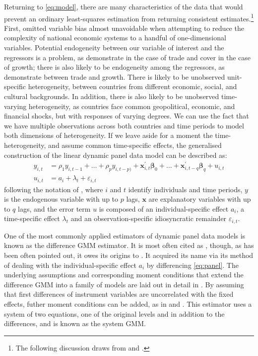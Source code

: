 \documentclass[12pt,a4paper]{article}
\begin{document}
Returning to \cref{eq:model}, there are many characteristics of the data that would prevent an ordinary least-squares estimation from returning consistent estimates.\footnote{
The following discussion draws from \cite{fritschGMMEstimationLinear2019} and \cite{rashidDynamicPanelData2018}.
}
First, omitted variable bias almost unavoidable when attempting to reduce the complexity of national economic systems to a handful of one-dimensional variables.
Potential endogeneity between our variable of interest and the regressors is a problem, as \cite{shahbazDynamicLinksEnergy2013} demonstrate in the case of trade and \cite{nayanRevisitingEnergyConsumption2013} cover in the case of growth; there is also likely to be endogeneity among the regressors, as \cite{rodriguezTradePolicyEconomic2001} demonstrate between trade and growth.
There is likely to be unobserved unit-specific heterogeneity, between countries from different economic, social, and cultural backgrounds.
In addition, there is also likely to be unobserved time-varying heterogeneity, as countries face common geopolitical, economic, and financial shocks, but with responses of varying degrees.
We can use the fact that we have multiple observations across both countries and time periods to model both dimensions of heterogeneity.
If we leave aside for a moment the time-heterogeneity, and assume common time-specific effects, the generalised construction of the linear dynamic panel data model can be described as:
\begin{align}
y_{i,t} &= \rho_1 y_{i,t-1} + \dots + \rho_p y_{i,t-p)} 
	+ \boldsymbol{x}^\prime_{i,t} \boldsymbol{\beta}_0 + \dots + \boldsymbol{x}^\prime_{i,t-q} \boldsymbol{\beta}_q 
	+ u_{i,t} \label{eq:panel} \\
u_{i,t} &= a_i + \lambda_t + \varepsilon_{i,t}
\end{align}
following the notation of \cite{fritschGMMEstimationLinear2019}, where $i$ and $t$ identify individuals and time periods, $y$ is the endogenous variable with up to $p$ lags, $\boldsymbol{x}$ are explanatory variables with up to $q$ lags, and the error term $u$ is composed of an individual-specific effect $a_i$, a time-specific effect $\lambda_t$ and an observation-specific  idiosyncratic remainder $\varepsilon_{i,t}$.

One of the most commonly applied estimators of dynamic panel data models is known as the difference GMM estimator.
It is most often cited as \cite{arellanoTestsSpecificationPanel1991}, though, as has been often pointed out, it owes its origins to \cite{holtz-eakinEstimatingVectorAutoregressions1988}.
It acquired its name via its method of dealing with the individual-specific effect $a_i$ by differencing \cref{eq:panel}.
The underlying assumptions and corresponding moment conditions that extend the difference GMM into a family of models are laid out in detail in \cite{fritschGMMEstimationLinear2019}.
By assuming that first differences of instrument variables are uncorrelated with the fixed effects, futher moment conditions can be added, as in \cite{arellanoAnotherLookInstrumental1995} and \cite{blundellInitialConditionsMoment1998}.
This estimator uses a system of two equations, one of the original levels and in addition to the differences, and is known as the system GMM.
\end{document}
